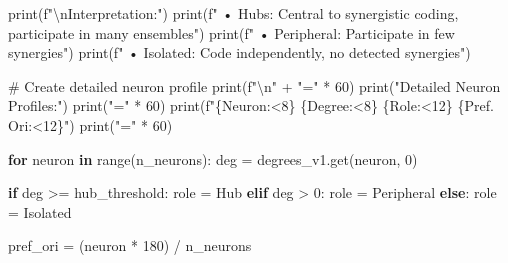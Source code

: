 \documentclass[
  11pt,
  letterpaper,
  oneside,
  openany]{book}
\newenvironment{Shaded}{\begin{snugshade}}{\end{snugshade}}
\newcommand{\BuiltInTok}[1]{\textcolor[rgb]{0.00,0.23,0.31}{#1}}
\newcommand{\CharTok}[1]{\textcolor[rgb]{0.13,0.47,0.30}{#1}}
\newcommand{\CommentTok}[1]{\textcolor[rgb]{0.37,0.37,0.37}{#1}}
\newcommand{\ControlFlowTok}[1]{\textcolor[rgb]{0.00,0.23,0.31}{\textbf{#1}}}
\newcommand{\DecValTok}[1]{\textcolor[rgb]{0.68,0.00,0.00}{#1}}
\newcommand{\KeywordTok}[1]{\textcolor[rgb]{0.00,0.23,0.31}{\textbf{#1}}}
\newcommand{\NormalTok}[1]{\textcolor[rgb]{0.00,0.23,0.31}{#1}}
\newcommand{\OperatorTok}[1]{\textcolor[rgb]{0.37,0.37,0.37}{#1}}
\newcommand{\SpecialCharTok}[1]{\textcolor[rgb]{0.37,0.37,0.37}{#1}}
\newcommand{\SpecialStringTok}[1]{\textcolor[rgb]{0.13,0.47,0.30}{#1}}
\newcommand{\StringTok}[1]{\textcolor[rgb]{0.13,0.47,0.30}{#1}}
\begin{document}
\begin{Shaded}
\begin{Highlighting}[]
\BuiltInTok{print}\NormalTok{(}\SpecialStringTok{f"}\CharTok{\textbackslash{}n}\SpecialStringTok{Interpretation:"}\NormalTok{)}
\BuiltInTok{print}\NormalTok{(}\SpecialStringTok{f"  • Hubs: Central to synergistic coding, participate in many ensembles"}\NormalTok{)}
\BuiltInTok{print}\NormalTok{(}\SpecialStringTok{f"  • Peripheral: Participate in few synergies"}\NormalTok{)}
\BuiltInTok{print}\NormalTok{(}\SpecialStringTok{f"  • Isolated: Code independently, no detected synergies"}\NormalTok{)}

\CommentTok{\# Create detailed neuron profile}
\BuiltInTok{print}\NormalTok{(}\SpecialStringTok{f"}\CharTok{\textbackslash{}n}\SpecialStringTok{"} \OperatorTok{+} \StringTok{"="} \OperatorTok{*} \DecValTok{60}\NormalTok{)}
\BuiltInTok{print}\NormalTok{(}\StringTok{"Detailed Neuron Profiles:"}\NormalTok{)}
\BuiltInTok{print}\NormalTok{(}\StringTok{"="} \OperatorTok{*} \DecValTok{60}\NormalTok{)}
\BuiltInTok{print}\NormalTok{(}\SpecialStringTok{f"}\SpecialCharTok{\{}\StringTok{\textquotesingle{}Neuron\textquotesingle{}}\SpecialCharTok{:\textless{}8\}}\SpecialStringTok{ }\SpecialCharTok{\{}\StringTok{\textquotesingle{}Degree\textquotesingle{}}\SpecialCharTok{:\textless{}8\}}\SpecialStringTok{ }\SpecialCharTok{\{}\StringTok{\textquotesingle{}Role\textquotesingle{}}\SpecialCharTok{:\textless{}12\}}\SpecialStringTok{ }\SpecialCharTok{\{}\StringTok{\textquotesingle{}Pref. Ori\textquotesingle{}}\SpecialCharTok{:\textless{}12\}}\SpecialStringTok{"}\NormalTok{)}
\BuiltInTok{print}\NormalTok{(}\StringTok{"="} \OperatorTok{*} \DecValTok{60}\NormalTok{)}

\ControlFlowTok{for}\NormalTok{ neuron }\KeywordTok{in} \BuiltInTok{range}\NormalTok{(n\_neurons):}
\NormalTok{    deg }\OperatorTok{=}\NormalTok{ degrees\_v1.get(neuron, }\DecValTok{0}\NormalTok{)}
    
    \ControlFlowTok{if}\NormalTok{ deg }\OperatorTok{\textgreater{}=}\NormalTok{ hub\_threshold:}
\NormalTok{        role }\OperatorTok{=} \StringTok{\textquotesingle{}Hub\textquotesingle{}}
    \ControlFlowTok{elif}\NormalTok{ deg }\OperatorTok{\textgreater{}} \DecValTok{0}\NormalTok{:}
\NormalTok{        role }\OperatorTok{=} \StringTok{\textquotesingle{}Peripheral\textquotesingle{}}
    \ControlFlowTok{else}\NormalTok{:}
\NormalTok{        role }\OperatorTok{=} \StringTok{\textquotesingle{}Isolated\textquotesingle{}}
    
\NormalTok{    pref\_ori }\OperatorTok{=}\NormalTok{ (neuron }\OperatorTok{*} \DecValTok{180}\NormalTok{) }\OperatorTok{/}\NormalTok{ n\_neurons}
    

\end{Highlighting}
\end{Shaded}
\end{document}
